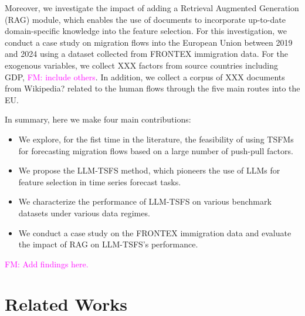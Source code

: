 \documentclass[conference]{IEEEtran}
\newcommand{\fm}[1]{\textcolor{magenta}{FM: #1}}
\newcommand{\method}{{LLM-TSFS}}
\begin{document}
%
Moreover, we investigate the impact of adding a Retrieval Augmented Generation (RAG) module, which enables the use of documents to incorporate up-to-date domain-specific knowledge into the feature selection. For this investigation, we conduct a case study on migration flows into the European Union between 2019 and 2024 using a dataset collected from FRONTEX immigration data. For the exogenous variables, we collect XXX factors from source countries including GDP, \fm{include others}. In addition, we collect a corpus of XXX documents from Wikipedia? related to the human flows through the five main routes into the EU.


In summary, here we make four main contributions:
\begin{itemize}
    \item We explore, for the fist time in the literature, the feasibility of using TSFMs for forecasting migration flows based on a large number of push-pull factors.
    \item We propose the \method{} method, which pioneers the use of LLMs for feature selection in time series forecast tasks.
    \item We characterize the performance of \method{} on various benchmark datasets under various data regimes.
    \item We conduct a case study on the FRONTEX immigration data and evaluate the impact of RAG on \method{}'s performance. 
\end{itemize}

\fm{Add findings here.}

\section{Related Works}
\end{document}
